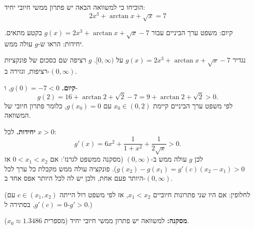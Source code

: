
\begin{question}
הוכיחו כי למשוואה הבאה יש פתרון ממשי חיובי יחיד:
\[ 2x^3+\arctan x+\sqrt{x}=7 \]
\end{question}

\begin{hint}
קיום: משפט ערך הביניים עבור $g(x)=2x^3+\arctan x+\sqrt x-7$ בקטע מתאים. יחידות: הראו ש-$g$ עולה ממש.
\end{hint}

\begin{solution}
נגדיר $g(x)=2x^3+\arctan x+\sqrt x-7$ על $[0,\infty)$. $g$ רציפה שם כסכום של פונקציות רציפות, וגזירה ב-$(0,\infty)$.

\textbf{קיום.} $g(0)=-7<0$, ו-
\[ g(2)=16+\arctan2+\sqrt2-7=9+\arctan 2+\sqrt2>0. \]
לפי משפט ערך הביניים קיימת $x_0\in(0,2)$ עם $g(x_0)=0$, כלומר פתרון חיובי של המשוואה.

\textbf{יחידות.} לכל $x>0$:
\[ g'(x)=6x^2+\frac1{1+x^2}+\frac1{2\sqrt x}>0. \]
לכן $g$ עולה ממש ב-$(0,\infty)$ (מסקנה ממשפט לגרנז': אם $0<x_1<x_2$ אז $g(x_2)-g(x_1)=g'(c)(x_2-x_1)>0$). פונקציה עולה ממש מקבלת כל ערך לכל היותר פעם אחת, ולכן יש לה לכל היותר אפס אחד ב-$(0,\infty)$.

(לחלופין: אם היו שני פתרונות חיוביים $x_1<x_2$, אז לפי משפט רול הייתה $c\in(x_1,x_2)$ עם $g'(c)=0$, בסתירה ל-$g'>0$.)

\textbf{מסקנה:} למשוואה יש פתרון ממשי חיובי יחיד (מספרית $x_0\approx1.3486$).
\end{solution}
